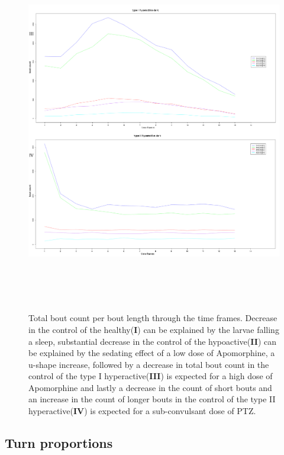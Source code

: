 \documentclass[a4paper,12pt]{article}
\begin{document}
\begin{figure}[h!]
\begin{center}
\includegraphics[width=15cm,height=16cm]{countChangeTime2.png}
\caption{Total bout count per bout length through the time frames. Decrease in the control of the healthy(\textbf{I}) can be explained by the larvae falling a sleep, substantial decrease in the control of the hypoactive(\textbf{II}) can be explained by the sedating effect of a low dose of Apomorphine, a u-shape increase, followed by a decrease in total bout count in the control of the type I hyperactive(\textbf{III}) is expected for a high dose of Apomorphine\cite{ref13} and lastly a decrease in the count of short bouts and an increase in the count of longer bouts in the control of the type II hyperactive(\textbf{IV}) is expected for a sub-convulsant dose of PTZ\cite{ref14}.}
\end{center}
\end{figure}


\subsection{Turn proportions}
\end{document}
